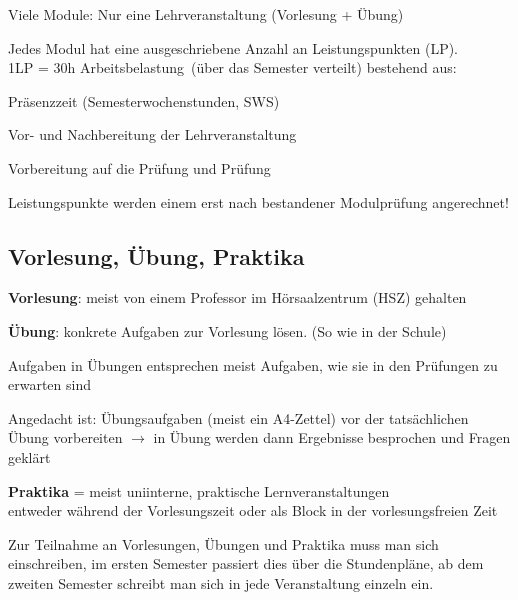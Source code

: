 \documentclass[a4paper,12pt]{report}
\begin{document}
\begin{itemize*}
    \item Viele Module: Nur eine Lehrveranstaltung (Vorlesung + Übung)
    \item Jedes Modul hat eine ausgeschriebene Anzahl an Leistungspunkten (LP).\\
    1LP = 30h \glqq Arbeitsbelastung\grqq\ (über das Semester verteilt) bestehend aus:
    \begin{itemize*}
        \item Präsenzzeit (Semesterwochenstunden, SWS)
        \item Vor- und Nachbereitung der Lehrveranstaltung
        \item Vorbereitung auf die Prüfung und Prüfung
    \end{itemize*}
    Leistungspunkte werden einem erst nach bestandener Modulprüfung angerechnet!
\end{itemize*}

\subsection{Vorlesung, Übung, Praktika}
\begin{itemize*}
    \item \textbf{Vorlesung}: meist von einem Professor im Hörsaalzentrum (HSZ) gehalten
    \item \textbf{Übung}: konkrete Aufgaben zur Vorlesung lösen. (So wie in der Schule)
    \item Aufgaben in Übungen entsprechen meist Aufgaben, wie sie in den Prüfungen zu erwarten sind
    \item Angedacht ist: Übungsaufgaben (meist ein A4-Zettel) vor der tatsächlichen Übung vorbereiten $\rightarrow$ in Übung werden dann Ergebnisse besprochen und Fragen geklärt
    \item \textbf{Praktika} = meist uniinterne, praktische Lernveranstaltungen\\
        entweder während der Vorlesungszeit oder als Block in der vorlesungsfreien Zeit
    \item Zur Teilnahme an Vorlesungen, Übungen und Praktika muss man sich einschreiben, im ersten Semester passiert dies über die Stundenpläne, ab dem zweiten Semester schreibt man sich in jede Veranstaltung einzeln ein.
\end{itemize*}
\end{document}

